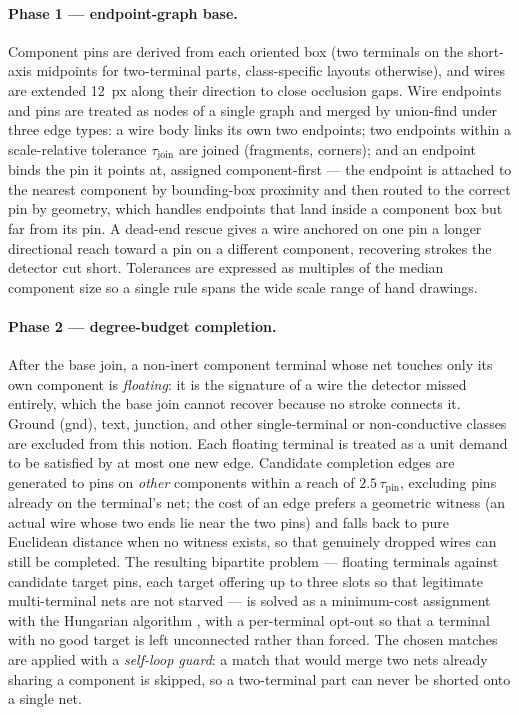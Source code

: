 \paragraph{Phase 1 --- endpoint-graph base.}
Component pins are derived from each oriented box (two terminals on the short-axis
midpoints for two-terminal parts, class-specific layouts otherwise), and wires are
extended 12~px along their direction to close occlusion gaps. Wire endpoints and
pins are treated as nodes of a single graph and merged by union-find under three
edge types: a wire body links its own two endpoints; two endpoints within a
scale-relative tolerance $\tau_{\mathrm{join}}$ are joined (fragments, corners);
and an endpoint binds the pin it points at, assigned component-first --- the
endpoint is attached to the nearest component by bounding-box proximity and then
routed to the correct pin by geometry, which handles endpoints that land inside a
component box but far from its pin. A dead-end rescue gives a wire anchored on one
pin a longer directional reach toward a pin on a different component, recovering
strokes the detector cut short. Tolerances are expressed as multiples of the
median component size so a single rule spans the wide scale range of hand drawings.

\paragraph{Phase 2 --- degree-budget completion.}
After the base join, a non-inert component terminal whose net touches only its own
component is \emph{floating}: it is the signature of a wire the detector missed
entirely, which the base join cannot recover because no stroke connects it.
Ground (gnd), text, junction, and other single-terminal or non-conductive classes
are excluded from this notion. Each floating terminal is treated as a unit demand
to be satisfied by at most one new edge. Candidate completion edges are generated
to pins on \emph{other} components within a reach of $2.5\,\tau_{\mathrm{pin}}$,
excluding pins already on the terminal's net; the cost of an edge prefers a
geometric witness (an actual wire whose two ends lie near the two pins) and falls
back to pure Euclidean distance when no witness exists, so that genuinely dropped
wires can still be completed. The resulting bipartite problem --- floating
terminals against candidate target pins, each target offering up to three slots so
that legitimate multi-terminal nets are not starved --- is solved as a
minimum-cost assignment with the Hungarian algorithm \cite{Kuhn1955}, with a
per-terminal opt-out so that a terminal with no good target is left unconnected
rather than forced. The chosen matches are applied with a \emph{self-loop guard}:
a match that would merge two nets already sharing a component is skipped, so a
two-terminal part can never be shorted onto a single net.

